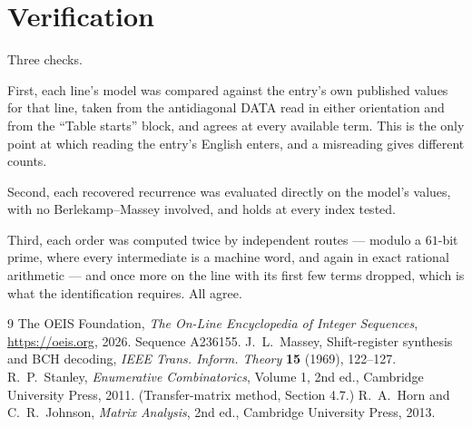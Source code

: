 \documentclass[11pt,a4paper]{article}
\theoremstyle{plain}
\theoremstyle{definition}
\begin{document}
\section{Verification}

Three checks.

First, each line's model was compared against the entry's own published values for that line,
taken from the antidiagonal DATA read in either orientation and from the ``Table starts''
block, and agrees at every available term. This is the only point at which reading the entry's
English enters, and a misreading gives different counts.

Second, each recovered recurrence was evaluated directly on the model's values, with no
Berlekamp--Massey involved, and holds at every index tested.

Third, each order was computed twice by independent routes --- modulo a $61$-bit prime, where
every intermediate is a machine word, and again in exact rational arithmetic --- and once more
on the line with its first few terms dropped, which is what the identification requires. All
agree.

\begin{thebibliography}{9}
 The OEIS Foundation, \emph{The On-Line Encyclopedia of Integer
Sequences}, \url{https://oeis.org}, 2026. Sequence A236155.
 J.~L.~Massey, Shift-register synthesis and BCH decoding, \emph{IEEE
Trans. Inform. Theory} \textbf{15} (1969), 122--127.
 R.~P.~Stanley, \emph{Enumerative Combinatorics}, Volume 1, 2nd ed.,
Cambridge University Press, 2011. (Transfer-matrix method, Section 4.7.)
 R.~A.~Horn and C.~R.~Johnson, \emph{Matrix Analysis}, 2nd ed., Cambridge
University Press, 2013.
\end{thebibliography}
\end{document}

